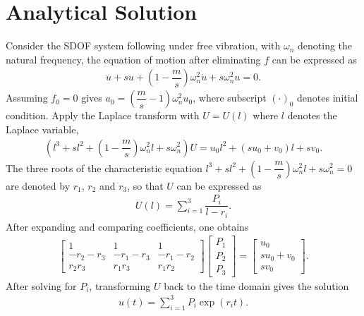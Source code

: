 \section{Analytical Solution}
Consider the SDOF system following  under free vibration, with $\omega_n$ denoting the natural frequency, the equation of motion after eliminating $f$ can be expressed as
\begin{gather}
\dddot{u}+s\ddot{u}+\left(1-\dfrac{m}{s}\right)\omega_n^2\dot{u}+s\omega_n^2u=0.
\end{gather}
Assuming $f_0=0$ gives $a_0=\left(\dfrac{m}{s}-1\right)\omega^2_nu_0$, where subscript $\left(\cdot\right)_0$ denotes initial condition.
Apply the Laplace transform with $U=U\left(l\right)$ where $l$ denotes the Laplace variable,
\begin{gather}
\left(l^3+sl^2+\left(1-\dfrac{m}{s}\right)\omega_n^2l+s\omega_n^2\right)U=u_0l^2+\left(su_0+v_0\right)l+sv_0.
\end{gather}
The three roots of the characteristic equation $l^3+sl^2+\left(1-\dfrac{m}{s}\right)\omega_n^2l+s\omega_n^2=0$ are denoted by $r_1$, $r_2$ and $r_3$, so that $U$ can be expressed as
\begin{gather}
U\left(l\right)=\sum_{i=1}^3\dfrac{P_i}{l-r_i}.
\end{gather}
After expanding and comparing coefficients, one obtains
\begin{gather}
\begin{bmatrix}
1&1&1\\
-r_2-r_3&-r_1-r_3&-r_1-r_2\\
r_2r_3&r_1r_3&r_1r_2
\end{bmatrix}
\begin{bmatrix}
P_1\\P_2\\P_3
\end{bmatrix}
=
\begin{bmatrix}
u_0\\
su_0+v_0\\
sv_0
\end{bmatrix}.
\end{gather}
After solving for $P_i$, transforming $U$ back to the time domain gives the solution
\begin{gather}
u(t)=\sum_{i=1}^3P_i\exp\left(r_it\right).
\end{gather}